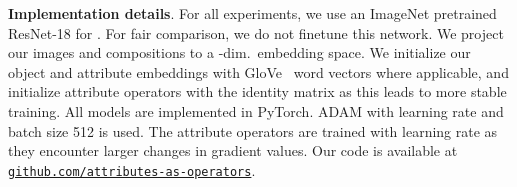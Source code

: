 \documentclass[runningheads]{llncs}
\begin{document}
\vspace{0.05in}
\noindent\textbf{Implementation details}.
For all experiments, we use an ImageNet \cite{russakovsky2015imagenet} pretrained ResNet-18 \cite{he2016deep} for . For fair comparison, we do not finetune this network.
We project our images and compositions to a -dim.~embedding space.
We initialize our object and attribute embeddings with GloVe~\cite{pennington2014glove} word vectors where applicable, and initialize attribute operators with the identity matrix as this leads to more stable training. All models are implemented in PyTorch. ADAM with learning rate  and batch size 512 is used. The attribute operators are trained with learning rate  as they encounter larger changes in gradient values. Our code is available at \href{https://github.com/Tushar-N/attributes-as-operators}{\texttt{github.com/attributes-as-operators}}.
\end{document}
